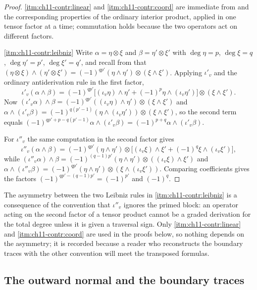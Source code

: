 \begin{proof}
\cref{itm:ch11-contr:linear} and \cref{itm:ch11-contr:coord} are immediate
from  and the corresponding properties of the
ordinary interior product, applied in one tensor factor at a time;
commutation holds because the two operators act on different factors.

\cref{itm:ch11-contr:leibniz}
Write $\alpha=\eta\otimes\xi$ and $\beta=\eta'\otimes\xi'$ with
$\deg\eta=p$, $\deg\xi=q$, $\deg\eta'=p'$, $\deg\xi'=q'$, and recall from
 that
$(\eta\otimes\xi)\wedge(\eta'\otimes\xi')
=(-1)^{qp'}(\eta\wedge\eta')\otimes(\xi\wedge\xi')$.  Applying $\iota'_v$ and
the ordinary antiderivation rule in the first factor,
\[
 \iota'_v(\alpha\wedge\beta)
 =(-1)^{qp'}\bigl[(\iota_v\eta)\wedge\eta'
   +(-1)^p\eta\wedge(\iota_v\eta')\bigr]\otimes(\xi\wedge\xi').
\]
Now $(\iota'_v\alpha)\wedge\beta=(-1)^{qp'}((\iota_v\eta)\wedge\eta')
\otimes(\xi\wedge\xi')$ and
$\alpha\wedge(\iota'_v\beta)=(-1)^{q(p'-1)}(\eta\wedge(\iota_v\eta'))
\otimes(\xi\wedge\xi')$, so the second term equals
$(-1)^{qp'+p-q(p'-1)}\alpha\wedge(\iota'_v\beta)
=(-1)^{p+q}\alpha\wedge(\iota'_v\beta)$.

For $\iota''_v$ the same computation in the second factor gives
\[
 \iota''_v(\alpha\wedge\beta)
 =(-1)^{qp'}(\eta\wedge\eta')\otimes
   \bigl[(\iota_v\xi)\wedge\xi'+(-1)^q\xi\wedge(\iota_v\xi')\bigr],
\]
while $(\iota''_v\alpha)\wedge\beta=(-1)^{(q-1)p'}(\eta\wedge\eta')
\otimes((\iota_v\xi)\wedge\xi')$ and
$\alpha\wedge(\iota''_v\beta)=(-1)^{qp'}(\eta\wedge\eta')
\otimes(\xi\wedge(\iota_v\xi'))$.  Comparing coefficients gives the
factors $(-1)^{qp'-(q-1)p'}=(-1)^{p'}$ and $(-1)^{q}$.
\end{proof}

The asymmetry between the two Leibniz rules in
\cref{itm:ch11-contr:leibniz} is a consequence of the convention that
$\iota''_v$ ignores the primed block: an operator acting on the second
factor of a tensor product cannot be a graded derivation for the total
degree unless it is given a traversal sign.  Only
\cref{itm:ch11-contr:linear} and \cref{itm:ch11-contr:coord} are used in the
proofs below, so nothing depends on the asymmetry; it is recorded because a
reader who reconstructs the boundary traces with the other convention will
meet the transposed formulas.

\subsection{The outward normal and the boundary traces}
\label{sec:ch11-traces}


